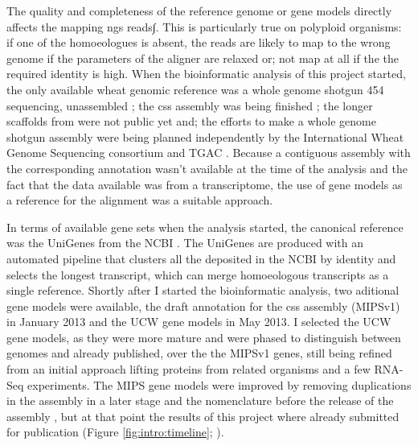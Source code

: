 The quality and completeness  of the reference genome or gene models directly affects the mapping \acrshort{ngs} reads∫. 
This is particularly true on polyploid organisms: if one of the homoeologues is absent, the reads are likely to map to the wrong genome if the parameters of the aligner are relaxed or; not map at all if the the required identity is high.
When the bioinformatic analysis of this project started, the only available wheat genomic reference was a whole genome shotgun 454 sequencing, unassembled \citep{Brenchley2012}; the \gls{css} assembly was being finished \citep{Mayer2014}; the longer scaffolds from \citet{Chapman2015} were not public yet and; the efforts to make a whole genome shotgun assembly were being planned independently by the International Wheat Genome Sequencing consortium  \citep{Pozniak2016} and TGAC \citep{Clark2016}.  
Because a contiguous assembly with the corresponding annotation wasn't available at the time of the analysis and the fact that the data available was from a transcriptome, the use of gene models as a reference for the alignment was a suitable approach. 

In terms of available gene sets when the analysis started, the canonical reference was the UniGenes from the NCBI \citep{PontiusJUWagnerL2002}. 
The UniGenes are produced with an automated pipeline that clusters all the  deposited in the NCBI by identity and selects the longest transcript, which can merge homoeologous transcripts as a single reference.
Shortly after I started the bioinformatic analysis, two aditional gene models were available, the draft annotation for the \acrshort{css} assembly (MIPSv1) in January 2013 and the UCW gene models \citep{Krasileva2013} in May 2013. 
I selected the UCW gene models, as they were more mature and were phased to distinguish between genomes and already published, over the the MIPSv1 genes, still being refined from an initial approach lifting proteins from related organisms and a few RNA-Seq experiments.  
The MIPS gene models were improved by removing duplications in the assembly in a later stage and the nomenclature before the release of the assembly \citep{Mayer2014}, but at that point the results of this project where already submitted for publication (Figure \ref{fig:intro:timeline}; \citealt{Ramirez-Gonzalez2015b}). 


